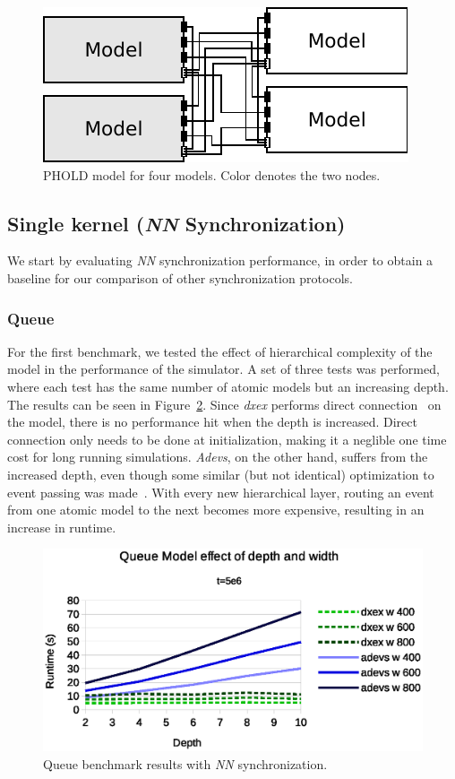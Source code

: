 \begin{figure}
    \center
	\includegraphics[width=\modelfraction\columnwidth]{fig/phold_model.pdf}
	\caption{PHOLD model for four models. Color denotes the two nodes.}
	\label{fig:PHOLD_model}
\end{figure}

\subsection{Single kernel (\textit{NN} Synchronization)}
We start by evaluating \textit{NN} synchronization performance, in order to obtain a baseline for our comparison of other synchronization protocols.

\subsubsection{Queue}
\label{4-seq-Queue}
For the first benchmark, we tested the effect of hierarchical complexity of the model in the performance of the simulator.
A set of three tests was performed, where each test has the same number of atomic models but an increasing depth.
The results can be seen in Figure~\ref{fig:Queue_benchmark_seq}.
Since \textit{dxex} performs direct connection~\cite{SymbolicFlattening} on the model, there is no performance hit when the depth is increased.
Direct connection only needs to be done at initialization, making it a neglible one time cost for long running simulations.
\textit{Adevs}, on the other hand, suffers from the increased depth, even though some similar (but not identical) optimization to event passing was made~\cite{adevs_opt}.
With every new hierarchical layer, routing an event from one atomic model to the next becomes more expensive, resulting in an increase in runtime.

\begin{figure}
	\center
	\includegraphics[width=\columnwidth]{fig/queue_fixed_sequential.eps}
	\caption{Queue benchmark results with \textit{NN} synchronization.}
	\label{fig:Queue_benchmark_seq}
\end{figure}

